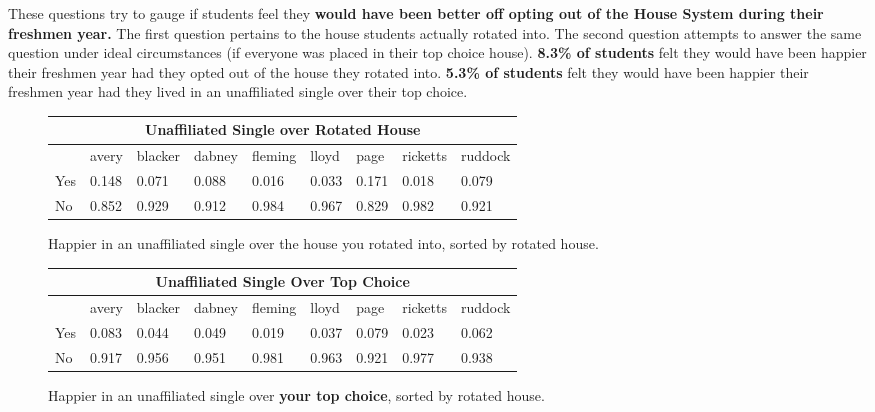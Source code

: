 \documentclass[12pt]{article} %
\begin{document}
These questions try to gauge if students feel they \textbf{would have been better off opting out of the House System during their freshmen year.} The first question pertains to the house students actually rotated into. The second question attempts to answer the same question under ideal circumstances (if everyone was placed in their top choice house). \textbf{8.3\% of students} felt they would have been happier their freshmen year had they opted out of the house they rotated into. \textbf{5.3\% of students} felt they would have been happier their freshmen year had they lived in an unaffiliated single over their top choice. 
\vspace{-3mm}
\begin{figure}[H]
	\begin{center}
	\vspace{-5mm}
\begin{tabular}{|m{1.3 cm}|m{1.3 cm}|m{1.3 cm}|m{1.3 cm}|m{1.3 cm}|m{1.3 cm}|m{1.3 cm}|m{1.3 cm}|m{1.3 cm} |}
\hline
\multicolumn{9}{|c|}{Unaffiliated Single over Rotated House}\\ \hline
& avery& blacker& dabney& fleming& lloyd& page& ricketts& ruddock\\ \hline
Yes   &  0.148 &  0.071 &  0.088 &  0.016 &  0.033 &  0.171 &  0.018 &  0.079\\ \hline
No   &  0.852 &  0.929 &  0.912 &  0.984 &  0.967 &  0.829 &  0.982 &  0.921\\ \hline
\end{tabular}
\end{center}
	\caption{Happier in an unaffiliated single over the house you rotated into, sorted by rotated house.}
\end{figure}



\begin{figure}[H]
	\begin{center}
\begin{tabular}{|m{1.3 cm}|m{1.3 cm}|m{1.3 cm}|m{1.3 cm}|m{1.3 cm}|m{1.3 cm}|m{1.3 cm}|m{1.3 cm}|m{1.3 cm} |}
\hline
\multicolumn{9}{|c|}{Unaffiliated Single Over Top Choice}\\ \hline
& avery& blacker& dabney& fleming& lloyd& page& ricketts& ruddock\\ \hline
Yes   &  0.083 &  0.044 &  0.049 &  0.019 &  0.037 &  0.079 &  0.023 &  0.062\\ \hline
No   &  0.917 &  0.956 &  0.951 &  0.981 &  0.963 &  0.921 &  0.977 &  0.938\\ \hline
\end{tabular}
\end{center}
	\caption{Happier in an unaffiliated single over \textbf{your top choice}, sorted by rotated house.}
\end{figure}
\end{document}
